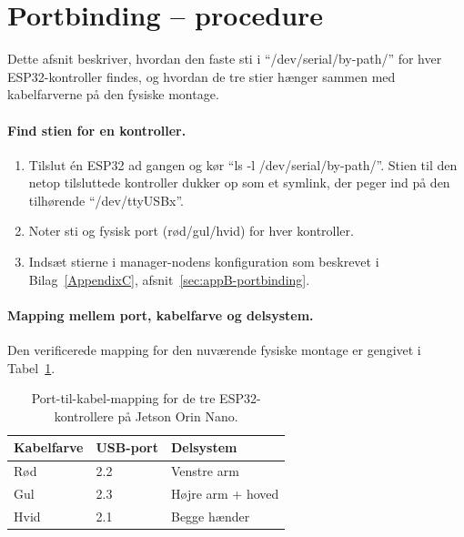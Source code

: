 \clearpage
\section{Portbinding -- procedure}
\label{sec:appC-portbinding}

Dette afsnit beskriver, hvordan den faste sti i
\enquote{/dev/serial/by-path/} for hver ESP32-kontroller findes,
og hvordan de tre stier hænger sammen med kabelfarverne på den
fysiske montage.

\paragraph{Find stien for en kontroller.}
\begin{enumerate}
    \item Tilslut én ESP32 ad gangen og kør
        \enquote{ls -l /dev/serial/by-path/}. Stien til den
        netop tilsluttede kontroller dukker op som et symlink, der
        peger ind på den tilhørende \enquote{/dev/ttyUSBx}.
    \item Noter sti og fysisk port (rød/gul/hvid) for hver
        kontroller.
    \item Indsæt stierne i manager-nodens konfiguration som
        beskrevet i Bilag~\ref{AppendixC},
        afsnit~\ref{sec:appB-portbinding}.
\end{enumerate}

\paragraph{Mapping mellem port, kabelfarve og delsystem.}
Den verificerede mapping for den nuværende fysiske montage er
gengivet i Tabel~\ref{tab:portmapping}.

\begin{table}[H]
\centering
\caption{Port-til-kabel-mapping for de tre ESP32-kontrollere
på Jetson Orin Nano.}
\label{tab:portmapping}
\begin{tabular}{@{}lll@{}}
\toprule
\textbf{Kabelfarve} & \textbf{USB-port} & \textbf{Delsystem} \\
\midrule
Rød  & 2.2 & Venstre arm \\
Gul  & 2.3 & Højre arm + hoved \\
Hvid & 2.1 & Begge hænder \\
\bottomrule
\end{tabular}
\end{table}

